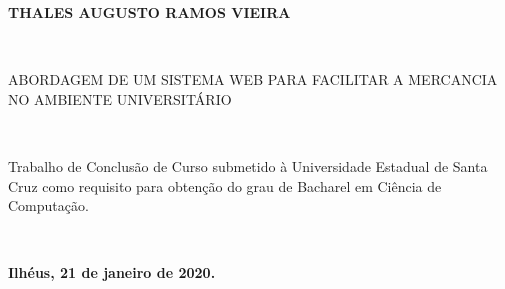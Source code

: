 
%
% 
%
\begin{folhadeaprovacao}


\begin{center}

    {\large \begin{large} \bfseries THALES AUGUSTO RAMOS VIEIRA \end{large}\\}
    \vspace{4cm}
    {\large\bfseries{\begin{large}ABORDAGEM DE UM SISTEMA WEB PARA FACILITAR A MERCANCIA NO AMBIENTE UNIVERSITÁRIO \end{large}}\\}
    \vspace{1cm}
    \hspace{.45\linewidth}
    \begin{minipage}{.50\linewidth}

            Trabalho de Conclusão de Curso submetido à Universidade Estadual de Santa Cruz  como requisito para obtenção do grau de Bacharel em Ciência de Computação.
    \end{minipage}
    \\
\end{center}
    \textbf{Ilhéus, 21 de janeiro de 2020.}
\begin{center}
           

    \bfseries{}
\end{center}


    \vspace{2.5cm}
    \vspace{3 cm}%

  
\end{folhadeaprovacao}